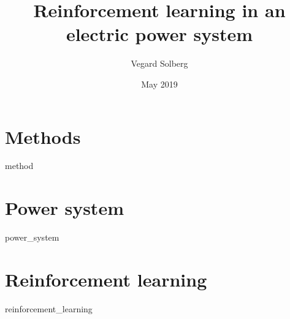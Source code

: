 \documentclass{book}
\title{Reinforcement learning in an electric power system}
\author{Vegard Solberg}
\date{May 2019}
\begin{document}
 
    \maketitle
    \tableofcontents
    
    \chapter{Methods}
    {method}

    
 
    \chapter{Power system}
    {power_system}
 
    \chapter{Reinforcement learning}
    {reinforcement_learning}
    
    \printbibliography
 
\end{document}
